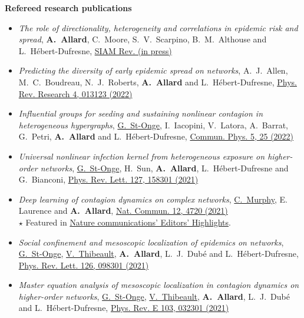 \documentclass[11pt]{article}
\begin{document}
%
%
%
\textbf{Refereed research publications}
%
\begin{itemize}[itemsep=0.5em]
%
  \item \textit{The role of directionality, heterogeneity and correlations in epidemic risk and spread}, \textbf{A.~Allard}, C.~Moore, S.~V.~Scarpino, B.~M.~Althouse and L.~H\'ebert-Dufresne, \href{https://arxiv.org/abs/2005.11283}{SIAM Rev. (in press)}
%
  \item \textit{Predicting the diversity of early epidemic spread on networks}, A.~J.~Allen, M.~C.~Boudreau, N.~J.~Roberts, \textbf{A.~Allard} and L.~H\'ebert-Dufresne, \href{https://doi.org/10.1103/PhysRevResearch.4.013123}{Phys. Rev. Research 4, 013123 (2022)}
%
  \item \textit{Influential groups for seeding and sustaining nonlinear contagion in heterogeneous hypergraphs}, \uline{G.~St-Onge}, I.~Iacopini, V.~Latora, A.~Barrat, G.~Petri, \textbf{A.~Allard} and L.~H\'ebert-Dufresne, \href{https://doi.org/10.1038/s42005-021-00788-w}{Commun. Phys. 5, 25 (2022)}
%
  \item \textit{Universal nonlinear infection kernel from heterogeneous exposure on higher-order networks}, \uline{G.~St-Onge}, H.~Sun, \textbf{A.~Allard}, L.~H\'ebert-Dufresne and G.~Bianconi, \href{https://doi.org/10.1103/PhysRevLett.127.158301}{Phys. Rev. Lett. 127, 158301 (2021)}
%
  \item \textit{Deep learning of contagion dynamics on complex networks}, \uline{C.~Murphy}, E. Laurence and \textbf{A.~Allard}, \href{https://arxiv.org/abs/2006.05410}{Nat. Commun. 12, 4720 (2021)}\\
  {\footnotesize $\star$ Featured in \href{https://www.nature.com/ncomms/editorshighlights}{Nature communications' Editors' Highlights}.}
%
  \item \textit{Social confinement and mesoscopic localization of epidemics on networks}, \uline{G.~St-Onge}, \uline{V.~Thibeault}, \textbf{A.~Allard}, L.~J.~Dub\'e and L.~H\'ebert-Dufresne, \href{http://doi.org/10.1103/PhysRevLett.126.098301}{Phys. Rev. Lett. 126, 098301 (2021)}
%
  \item \textit{Master equation analysis of mesoscopic localization in contagion dynamics on higher-order networks}, \uline{G.~St-Onge}, \uline{V.~Thibeault}, \textbf{A.~Allard}, L.~J.~Dub\'e and L.~H\'ebert-Dufresne, \href{http://doi.org/10.1103/PhysRevE.103.032301}{Phys. Rev. E 103, 032301 (2021)}

\end{itemize}
\end{document}
